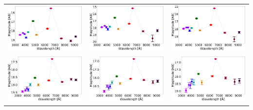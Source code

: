 \begin{table}[!h]
\begin{tabular}{ccc}
\includegraphics[width=0.3\linewidth, clip]{photopectrum_splus_MC0115-112627_aper.pdf} & \includegraphics[width=0.3\linewidth, clip]{photopectrum_splus_MC0115-112627_auto.pdf} & \includegraphics[width=0.3\linewidth, clip]{photopectrum_splus_MC0115-112627_petro.pdf} \\
\includegraphics[width=0.3\linewidth, clip]{photopectrum_splus_MC0115-147165_aper.pdf} & \includegraphics[width=0.3\linewidth, clip]{photopectrum_splus_MC0115-147165_auto.pdf} & \includegraphics[width=0.3\linewidth, clip]{photopectrum_splus_MC0115-147165_petro.pdf} \\

\end{tabular}
\end{table}
